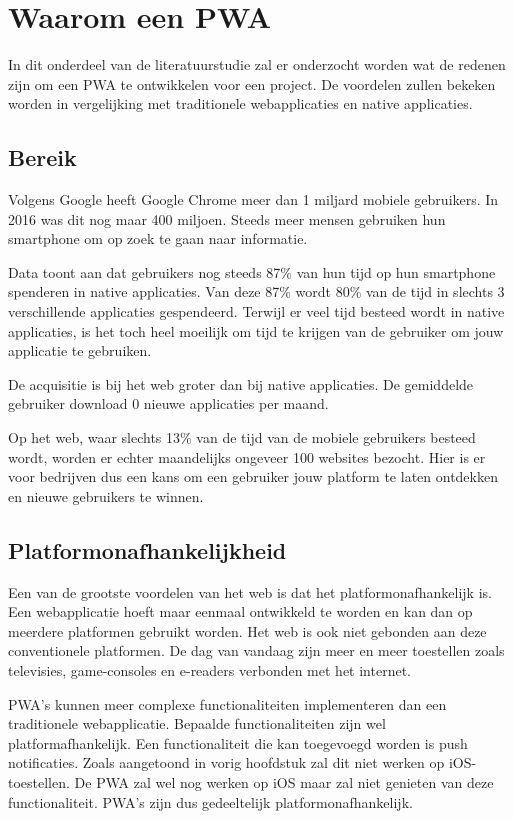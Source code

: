 \clearpage
\section{Waarom een PWA}

In dit onderdeel van de literatuurstudie zal er onderzocht worden wat de redenen zijn om een PWA te ontwikkelen voor een project. De voordelen zullen bekeken worden in vergelijking met traditionele webapplicaties en native applicaties.
\autocite{TandelSunil2018}


\subsection{Bereik}
	Volgens Google heeft Google Chrome meer dan 1 miljard mobiele gebruikers. In 2016 was dit nog maar 400 miljoen. Steeds meer mensen gebruiken hun smartphone om op zoek te gaan naar informatie. 
	\autocite{Nath2017}
	
	Data toont aan dat gebruikers nog steeds 87\% van hun tijd op hun smartphone spenderen in native applicaties. Van deze 87\% wordt 80\% van de tijd in slechts 3 verschillende applicaties gespendeerd. Terwijl er veel tijd besteed wordt in native applicaties, is het toch heel moeilijk om tijd te krijgen van de gebruiker om jouw applicatie te gebruiken.
	
	De acquisitie is bij het web groter dan bij native applicaties. De gemiddelde gebruiker download 0 nieuwe applicaties per maand. 
	
	Op het web, waar slechts 13\% van de tijd van de mobiele gebruikers besteed wordt, worden er echter maandelijks ongeveer 100 websites bezocht. Hier is er voor bedrijven dus een kans om een gebruiker jouw platform te laten ontdekken en nieuwe gebruikers te winnen.
	\autocite{GoogleChromeDevelopers2017}
	

\subsection{Platformonafhankelijkheid }
	Een van de grootste voordelen van het web is dat het platformonafhankelijk is. Een webapplicatie hoeft maar eenmaal ontwikkeld te worden en kan dan op meerdere platformen gebruikt worden. Het web is ook niet gebonden aan deze conventionele platformen. De dag van vandaag zijn meer en meer toestellen zoals televisies, game-consoles en e-readers verbonden met het internet. 
	
	PWA's kunnen meer complexe functionaliteiten implementeren dan een traditionele webapplicatie. Bepaalde functionaliteiten zijn wel platformafhankelijk. Een functionaliteit die kan toegevoegd worden is push notificaties. Zoals aangetoond in vorig hoofdstuk zal dit niet werken op iOS-toestellen. De PWA zal wel nog werken op iOS maar zal niet genieten van deze functionaliteit. PWA's zijn dus gedeeltelijk platformonafhankelijk.
	
